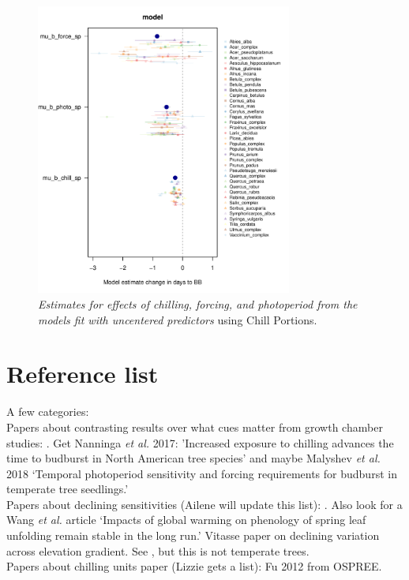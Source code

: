\documentclass{article}
\begin{document}
\begin{figure}[h!]
\centering
\noindent \includegraphics[width=0.75\textwidth]{..//..//analyses/bb_analysis/figures/muplotmodelm2lni_spcompexprampfpcp_nonz.pdf}
\caption{\emph{Estimates for effects of chilling, forcing, and photoperiod from the models fit with uncentered predictors} using Chill Portions.} 
\label{fig:mucpnonz}
\end{figure}

\section*{Reference list}

A few categories:\\

Papers about contrasting results over what cues matter from growth chamber studies: \cite{Basler:2012,Basler:2014aa,Caffarra:2011qf,Caffarra:2011a,Caffarra:2011b,Heide:2005aa,koerner2010b,Laube:2014a,vitasse2013,zohner2016}. Get Nanninga \emph{et al.} 2017: 'Increased exposure to chilling advances the time to budburst in North American tree species' and maybe Malyshev \emph{et al.} 2018 `Temporal photoperiod sensitivity and forcing requirements for budburst in temperate tree seedlings.'\\

Papers about declining sensitivities (Ailene will update this list): \cite{Rutishauser:2008,fu2015}. Also look for a Wang \emph{et al.} article `Impacts of global warming on phenology of spring leaf unfolding remain stable in the long run.' Vitasse paper on declining variation across elevation gradient. See \cite{yu2010}, but this is not temperate trees. \\

Papers about chilling units paper (Lizzie gets a list): Fu 2012 from OSPREE. \cite{harrington2015}\cite{lued2011,Luedeling:2011qe,Luedeling2013AgFM}\\



\end{document}
